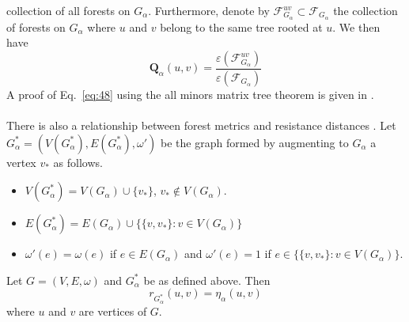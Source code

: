 collection of all forests on $G_\alpha$. Furthermore, denote by
$\mathscr{F}_{G_\alpha}^{uv} \subset \mathscr{F}_{G_\alpha}$ the
collection of forests on $G_\alpha$ where $u$ and $v$ belong to the
same tree rooted at $u$. We then have
\begin{equation}
  \label{eq:48}
  \mathbf{Q}_{\alpha}(u,v) = \frac{\varepsilon(\mathscr{F}_{G_{\alpha}}^{uv})}{\varepsilon(\mathscr{F}_{G_{\alpha}})}
\end{equation}
A proof of Eq.~\eqref{eq:48} using the all minors matrix tree theorem
\citep{chaiken82,moon94:_some_deter_expan_and_matrix_tree_theor} is
given in \citet{chebotarev02:_fores_laplac}. \\
\\
%
\noindent
There is also a relationship between forest metrics and resistance
distances \citep{chebotarev02:_fores_metric_for_graph_vertic}. Let
$G_{\alpha}^{*} = (V(G_{\alpha}^{*}),E(G_{\alpha}^{*}),\omega')$ be
the graph formed by augmenting to $G_\alpha$ a vertex $v_*$ as
follows.
\begin{itemize}
\item $V(G_{\alpha}^{*}) = V(G_{\alpha}) \cup \{v_*\}$, $v_* \not \in
  V(G_{\alpha})$.
\item $E(G_{\alpha}^{*}) = E(G_{\alpha}) \cup \{ \{v, v_*\} \colon v
  \in V(G_{\alpha}) \}$
\item $\omega'(e) = \omega(e)$ if $e \in E(G_{\alpha})$ and
  $\omega'(e) = 1$ if $e \in \{ \{v,v_*\} \colon v \in V(G_{\alpha})
  \}$.
\end{itemize}
\begin{proposition}
  \label{prop:9}
  Let $G = (V,E,\omega)$ and $G_{\alpha}^{*}$ be as defined
  above. Then
  \begin{equation}
    \label{eq:54}
    r_{G_{\alpha}^{*}}(u,v) = \eta_{\alpha}(u,v)
  \end{equation}
  where $u$ and $v$ are vertices of $G$. 
\end{proposition}
